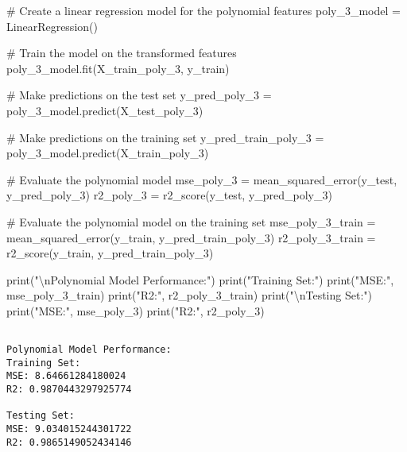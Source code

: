 \documentclass[
  letterpaper,
  DIV=11,
  numbers=noendperiod]{scrreprt}
\newenvironment{Shaded}{\begin{snugshade}}{\end{snugshade}}
\newcommand{\BuiltInTok}[1]{\textcolor[rgb]{0.00,0.23,0.31}{#1}}
\newcommand{\CharTok}[1]{\textcolor[rgb]{0.13,0.47,0.30}{#1}}
\newcommand{\CommentTok}[1]{\textcolor[rgb]{0.37,0.37,0.37}{#1}}
\newcommand{\NormalTok}[1]{\textcolor[rgb]{0.00,0.23,0.31}{#1}}
\newcommand{\OperatorTok}[1]{\textcolor[rgb]{0.37,0.37,0.37}{#1}}
\newcommand{\StringTok}[1]{\textcolor[rgb]{0.13,0.47,0.30}{#1}}
\begin{document}
\begin{Shaded}
\begin{Highlighting}[]
\CommentTok{\# Create a linear regression model for the polynomial features}
\NormalTok{poly\_3\_model }\OperatorTok{=}\NormalTok{ LinearRegression()}

\CommentTok{\# Train the model on the transformed features}
\NormalTok{poly\_3\_model.fit(X\_train\_poly\_3, y\_train)}

\CommentTok{\# Make predictions on the test set}
\NormalTok{y\_pred\_poly\_3 }\OperatorTok{=}\NormalTok{ poly\_3\_model.predict(X\_test\_poly\_3)}

\CommentTok{\# Make predictions on the training set}
\NormalTok{y\_pred\_train\_poly\_3 }\OperatorTok{=}\NormalTok{ poly\_3\_model.predict(X\_train\_poly\_3)}

\CommentTok{\# Evaluate the polynomial model}
\NormalTok{mse\_poly\_3 }\OperatorTok{=}\NormalTok{ mean\_squared\_error(y\_test, y\_pred\_poly\_3)}
\NormalTok{r2\_poly\_3 }\OperatorTok{=}\NormalTok{ r2\_score(y\_test, y\_pred\_poly\_3)}

\CommentTok{\# Evaluate the polynomial model on the training set}
\NormalTok{mse\_poly\_3\_train }\OperatorTok{=}\NormalTok{ mean\_squared\_error(y\_train, y\_pred\_train\_poly\_3)}
\NormalTok{r2\_poly\_3\_train }\OperatorTok{=}\NormalTok{ r2\_score(y\_train, y\_pred\_train\_poly\_3)}

\BuiltInTok{print}\NormalTok{(}\StringTok{"}\CharTok{\textbackslash{}n}\StringTok{Polynomial Model Performance:"}\NormalTok{)}
\BuiltInTok{print}\NormalTok{(}\StringTok{"Training Set:"}\NormalTok{)}
\BuiltInTok{print}\NormalTok{(}\StringTok{"MSE:"}\NormalTok{, mse\_poly\_3\_train)}
\BuiltInTok{print}\NormalTok{(}\StringTok{"R2:"}\NormalTok{, r2\_poly\_3\_train)}
\BuiltInTok{print}\NormalTok{(}\StringTok{"}\CharTok{\textbackslash{}n}\StringTok{Testing Set:"}\NormalTok{)}
\BuiltInTok{print}\NormalTok{(}\StringTok{"MSE:"}\NormalTok{, mse\_poly\_3)}
\BuiltInTok{print}\NormalTok{(}\StringTok{"R2:"}\NormalTok{, r2\_poly\_3)}
\end{Highlighting}
\end{Shaded}

\begin{verbatim}

Polynomial Model Performance:
Training Set:
MSE: 8.64661284180024
R2: 0.9870443297925774

Testing Set:
MSE: 9.034015244301722
R2: 0.9865149052434146
\end{verbatim}
\end{document}

